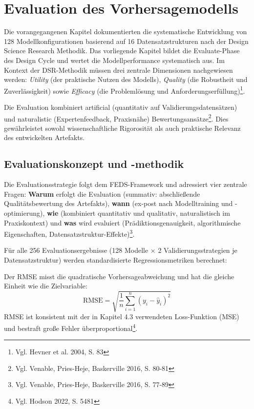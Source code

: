 \chapter{Evaluation des Vorhersagemodells}

Die vorangegangenen Kapitel dokumentierten die systematische Entwicklung von 128 Modellkonfigurationen basierend auf 16 Datensatzstrukturen nach der Design Science Research Methodik. Das vorliegende Kapitel bildet die Evaluate-Phase des Design Cycle und wertet die Modellperformance systematisch aus. Im Kontext der DSR-Methodik müssen drei zentrale Dimensionen nachgewiesen werden: \textit{Utility} (der praktische Nutzen des Modells), \textit{Quality} (die Robustheit und Zuverlässigkeit) sowie \textit{Efficacy} (die Problemlösung und Anforderungserfüllung)\footnote{Vgl. Hevner et al. 2004, S. 83}.

Die Evaluation kombiniert artificial (quantitativ auf Validierungsdatensätzen) und naturalistic (Expertenfeedback, Praxisnähe) Bewertungsansätze\footnote{Vgl. Venable, Pries-Heje, Baskerville 2016, S. 80-81}. Dies gewährleistet sowohl wissenschaftliche Rigorosität als auch praktische Relevanz des entwickelten Artefakts.


\section{Evaluationskonzept und -methodik}

Die Evaluationsstrategie folgt dem FEDS-Framework und adressiert vier zentrale Fragen: \textbf{Warum} erfolgt die Evaluation (summativ: abschließende Qualitätsbewertung des Artefakts), \textbf{wann} (ex-post nach Modelltraining und -optimierung), \textbf{wie} (kombiniert quantitativ und qualitativ, naturalistisch im Praxiskontext) und \textbf{was} wird evaluiert (Prädiktionsgenauigkeit, algorithmische Eigenschaften, Datensatzstruktur-Effekte)\footnote{Vgl. Venable, Pries-Heje, Baskerville 2016, S. 77-89}.

Für alle 256 Evaluationsergebnisse (128 Modelle × 2 Validierungsstrategien je Datensatzstruktur) werden standardisierte Regressionsmetriken berechnet:

Der \ac{RMSE} misst die quadratische Vorhersageabweichung und hat die gleiche Einheit wie die Zielvariable:
\[
\text{RMSE} = \sqrt{\frac{1}{n}\sum_{i=1}^{n}(y_i - \hat{y}_i)^2}
\]
RMSE ist konsistent mit der in Kapitel 4.3 verwendeten Loss-Funktion (MSE) und bestraft große Fehler überproportional\footnote{Vgl. Hodson 2022, S. 5481}.

